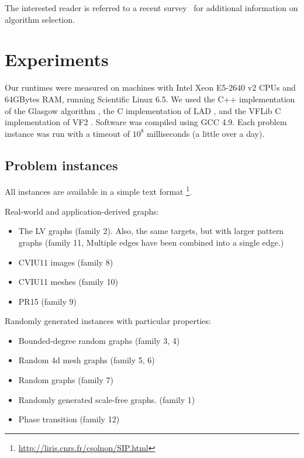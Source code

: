 \documentclass{llncs}
\begin{document}
The interested reader is referred to a recent
survey~\cite{kotthoff_algorithm_2014} for additional information on algorithm
selection.

\section{Experiments}

Our runtimes were measured on machines with Intel Xeon E5-2640 v2 CPUs and 64GBytes RAM, running
Scientific Linux 6.5. We used the C++ implementation of the Glasgow algorithm \cite{McCreesh:2015},
the C implementation of LAD \cite{Solnon:2010}, and the VFLib C implementation of VF2
\cite{Cordella:2004}. Software was compiled using GCC 4.9. Each problem instance was run with a
timeout of $10^8$ milliseconds (a little over a day).

\subsection{Problem instances}

All instances are available in a simple text format
\footnote{\url{http://liris.cnrs.fr/csolnon/SIP.html}}.

Real-world and application-derived graphs:

\begin{itemize}
    \item The LV graphs (family 2). Also, the same targets, but with larger pattern graphs (family
        11, Multiple edges have been combined into a single edge.)
    \item CVIU11 images (family 8)
    \item CVIU11 meshes (family 10)
    \item PR15 (family 9)
\end{itemize}

\noindent Randomly generated instances with particular properties:

\begin{itemize}
    \item Bounded-degree random graphs (family 3, 4) \cite{GraphDatabase}
    \item Random 4d mesh graphs (family 5, 6) \cite{GraphDatabase}
    \item Random graphs (family 7) \cite{GraphDatabase}
    \item Randomly generated scale-free graphs. (family 1) \cite{Solnon:2010}
    \item Phase transition (family 12)
\end{itemize}
\end{document}
